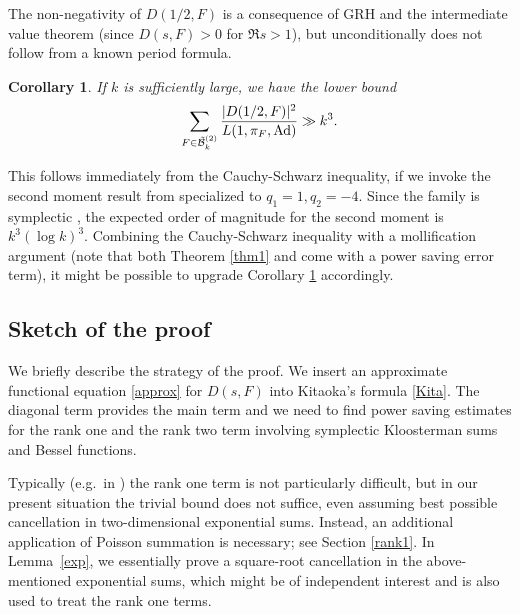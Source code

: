 \documentclass[11pt]{amsart}
\numberwithin{equation}{section}
\theoremstyle{plain}
\newtheorem{cor}[theorem]{Corollary}
\theoremstyle{definition}
\numberwithin{equation}{section}
\begin{document}
The non-negativity of $D(1/2, F)$ is a consequence of GRH and the intermediate value theorem (since $D(s, F) > 0$ for $\Re s > 1$), but unconditionally does not follow from a known period formula. 



\begin{cor}\label{Kor3}
     If $k$ is sufficiently large, we have the lower bound
\begin{align}
\sum_{F \in \tilde{\mathcal{B}}_k^{(2)}} \frac{|D(1/2, F)|^2}{ L(1, \pi_F,\text{{\rm Ad}})} \gg k^3.
\end{align}
\end{cor}
This follows immediately from the Cauchy-Schwarz inequality, if we invoke the second moment result from \cite[Theorem~2]{Bl}
specialized to $q_1=1, q_2=-4$. Since the family is symplectic \cite[Section 10.2]{KWY}, the expected order of magnitude for the second moment is $k^3 (\log k)^3$. Combining the Cauchy-Schwarz inequality with a mollification argument (note that both Theorem \ref{thm1} and \cite{Bl} come with a power saving error term), it might be possible to upgrade Corollary \ref{Kor3} accordingly. 

 

\subsection{Sketch of the proof}
We briefly  describe the strategy of the proof. We insert an approximate functional equation \eqref{approx} for $D(s, F)$ into Kitaoka's formula \eqref{Kita}. The diagonal term provides the main term and we need to find power saving estimates for the rank one and the rank two term involving symplectic Kloosterman sums and Bessel functions. 

Typically (e.g.\ in \cite{Bl}) the rank one term is not particularly difficult, but in our present situation the   trivial bound does not suffice, even assuming best possible cancellation in two-dimensional exponential sums. 
Instead, an additional  application of Poisson summation is necessary; see Section \ref{rank1}. In Lemma~\ref{exp}, we essentially prove a square-root cancellation in the above-mentioned exponential sums, which might be of independent interest and is also used to treat the rank one terms. 
\end{document}
